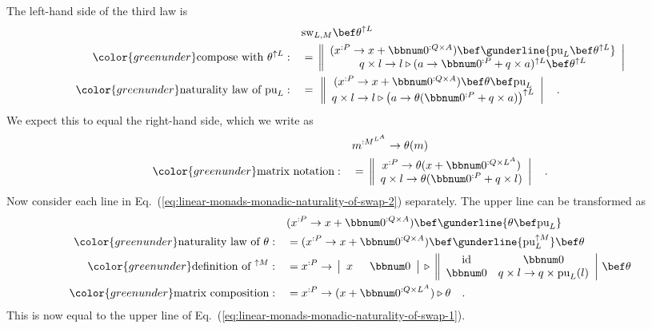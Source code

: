 The left-hand side of the third law is
\begin{align}
 & \text{sw}_{L,M}\bef\theta^{\uparrow L}\nonumber \\
{\color{greenunder}\text{compose with }\theta^{\uparrow L}:}\quad & =\,\left\Vert \begin{array}{c}
(x^{:P}\rightarrow x+\bbnum 0^{:Q\times A})\bef\gunderline{\text{pu}_{L}\bef\theta^{\uparrow L}}\\
q\times l\rightarrow l\triangleright(a\rightarrow\bbnum 0^{:P}+q\times a)^{\uparrow L}\bef\theta^{\uparrow L}
\end{array}\right|\nonumber \\
{\color{greenunder}\text{naturality law of }\text{pu}_{L}:}\quad & =\,\,\left\Vert \begin{array}{c}
(x^{:P}\rightarrow x+\bbnum 0^{:Q\times A})\bef\theta\bef\text{pu}_{L}\\
q\times l\rightarrow l\triangleright\big(a\rightarrow\theta(\bbnum 0^{:P}+q\times a)\big)^{\uparrow L}
\end{array}\right|\quad.\label{eq:linear-monads-monadic-naturality-of-swap-2}
\end{align}
We expect this to equal the right-hand side, which we write as
\begin{align}
 & m^{:M^{L^{A}}}\rightarrow\theta(m)\nonumber \\
{\color{greenunder}\text{matrix notation}:}\quad & =\,\left\Vert \begin{array}{c}
x^{:P}\rightarrow\theta(x+\bbnum 0^{:Q\times L^{A}})\\
q\times l\rightarrow\theta(\bbnum 0^{:P}+q\times l)
\end{array}\right|\quad.\label{eq:linear-monads-monadic-naturality-of-swap-1}
\end{align}
Now consider each line in Eq.~(\ref{eq:linear-monads-monadic-naturality-of-swap-2})
separately. The upper line can be transformed as
\begin{align*}
 & (x^{:P}\rightarrow x+\bbnum 0^{:Q\times A})\bef\gunderline{\theta\bef\text{pu}_{L}}\\
{\color{greenunder}\text{naturality law of }\theta:}\quad & =(x^{:P}\rightarrow x+\bbnum 0^{:Q\times A})\bef\gunderline{\text{pu}_{L}^{\uparrow M}}\bef\theta\\
{\color{greenunder}\text{definition of }^{\uparrow M}:}\quad & =x^{:P}\rightarrow\,\left|\begin{array}{cc}
x\enskip & \bbnum 0\end{array}\right|\,\triangleright\,\left\Vert \begin{array}{cc}
\text{id} & \bbnum 0\\
\bbnum 0 & q\times l\rightarrow q\times\text{pu}_{L}(l)
\end{array}\right|\,\bef\theta\\
{\color{greenunder}\text{matrix composition}:}\quad & =x^{:P}\rightarrow(x+\bbnum 0^{:Q\times L^{A}})\triangleright\theta\quad.
\end{align*}
This is now equal to the upper line of Eq.~(\ref{eq:linear-monads-monadic-naturality-of-swap-1}).

